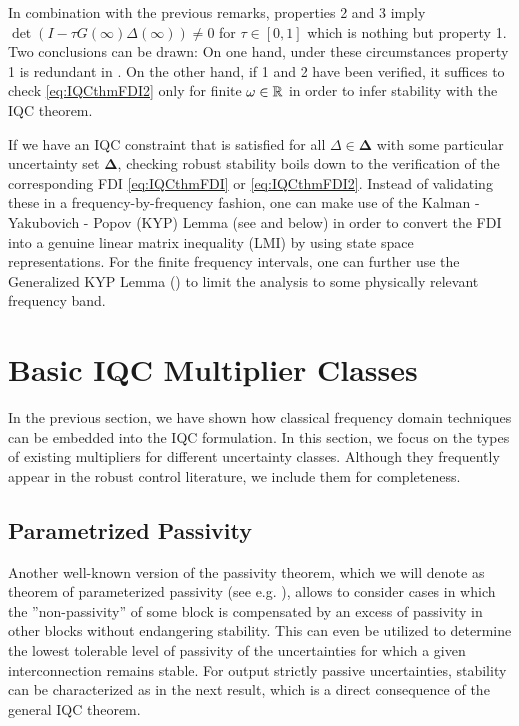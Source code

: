 \begin{rem}\label{rem:iqc3}
In combination with the previous remarks, properties 2 and 3 imply
$\det(I-\tau G(\infty)\Delta(\infty))\neq 0$ for $\tau\in[0,1]$
which is nothing but property 1.
Two conclusions can be drawn: On one hand, under these circumstances property 1 is redundant in . On the other 
hand, if 1 and 2 have been verified, it suffices to check \eqref{eq:IQCthmFDI2} only for finite 
$\omega\in\mathbb{R}$ in order to infer stability with the IQC theorem.
\end{rem}


If we have an IQC constraint that is satisfied for all $\Delta\in\bm{\Delta}$ with some particular uncertainty 
set $\bm{\Delta}$, checking robust stability boils down to the verification of the corresponding FDI \eqref{eq:IQCthmFDI} 
or \eqref{eq:IQCthmFDI2}. Instead of validating these in a frequency-by-frequency fashion, one can make use of 
the Kalman - Yakubovich - Popov (KYP) Lemma (see \cite{rantzerkyp} and below) in order to convert the FDI into 
a genuine linear matrix inequality (LMI) by using state space representations. For the finite frequency intervals, 
one can further use the Generalized KYP Lemma (\cite{genelKYP}) to limit the analysis to some physically relevant frequency band.

\section{Basic IQC Multiplier Classes}
In the previous section, we have shown how classical frequency domain techniques can be embedded into the IQC formulation. 
In this section, we focus on the types of existing multipliers for different uncertainty classes. Although they frequently 
appear in the robust control literature, we include them for completeness.


\subsection{Parametrized Passivity}\label{sec:osppass}
Another well-known version of the passivity theorem, {which we will denote as} theorem of parameterized passivity (see e.g. 
\cite[Thm. VI.5.10]{desvid}), allows to consider cases in which the ''non-passivity'' of some block is compensated by an 
excess of passivity in other blocks without endangering stability. This can even be utilized to determine the lowest 
tolerable level of passivity of the uncertainties for which a given interconnection remains stable. For output strictly passive 
uncertainties, stability can be characterized as in the next result, which is a direct consequence of the general IQC theorem.

